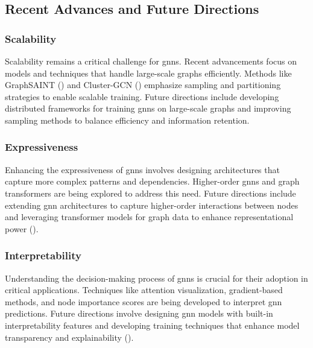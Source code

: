 \subsection*{Recent Advances and Future Directions}

\subsubsection*{Scalability}
Scalability remains a critical challenge for \glspl{gnn}.
Recent advancements focus on models and techniques that handle large-scale graphs efficiently.
Methods like GraphSAINT (\cite{Zeng2019}) and Cluster-GCN (\cite{Chiang2019}) emphasize sampling and partitioning strategies to enable scalable training.
Future directions include developing distributed frameworks for training \glspl{gnn} on large-scale graphs and improving sampling methods to balance efficiency and information retention.

\subsubsection*{Expressiveness}
Enhancing the expressiveness of \glspl{gnn} involves designing architectures that capture more complex patterns and dependencies.
Higher-order \glspl{gnn} and graph transformers are being explored to address this need.
Future directions include extending \gls{gnn} architectures to capture higher-order interactions between nodes and leveraging transformer models for graph data to enhance representational power (\cite{Xu2019,Velickovic2018}).

\subsubsection*{Interpretability}
Understanding the decision-making process of \glspl{gnn} is crucial for their adoption in critical applications.
Techniques like attention visualization, gradient-based methods, and node importance scores are being developed to interpret \gls{gnn} predictions.
Future directions involve designing \gls{gnn} models with built-in interpretability features and developing training techniques that enhance model transparency and explainability (\cite{Ying2018,Lee2018}).

